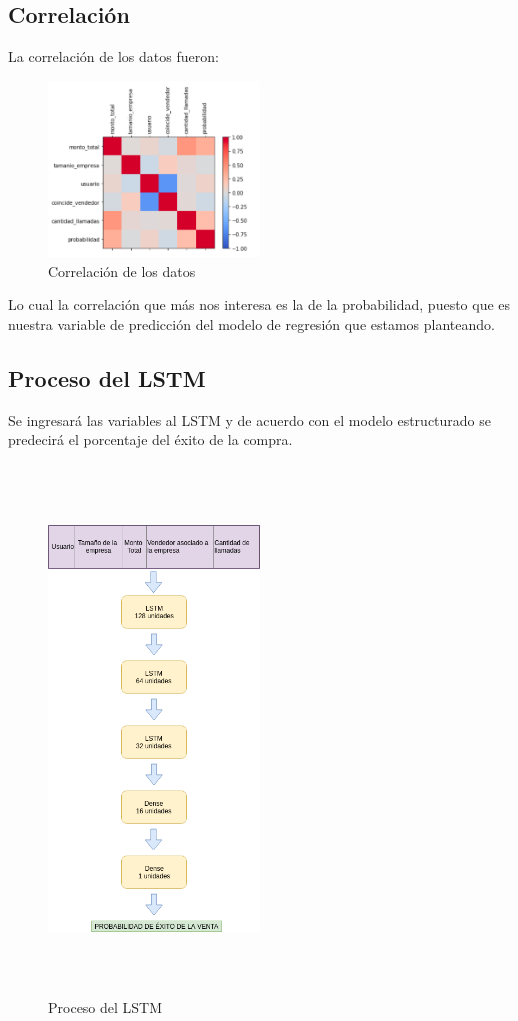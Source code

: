 \documentclass[conference]{IEEEtran}
\begin{document}
\subsection{Correlación}
La correlación de los datos fueron:
\begin{figure}[H]
    \centering
    \includegraphics[width=0.5\textwidth]{preprocesamiento/correlacion_datos}
    \caption{Correlación de los datos}
    \label{fig:correlacion_datos}
\end{figure}
Lo cual la correlación que más nos interesa es la de la probabilidad,
puesto que es nuestra variable de predicción del modelo de regresión que estamos 
planteando.
\subsection{Proceso del LSTM}
Se ingresará las variables al LSTM y de acuerdo con el modelo estructurado se predecirá el porcentaje del éxito de la compra.
\begin{figure}[H]
    \centering
    \includegraphics[width=0.5\textwidth,height=14cm]{LSTM}
    \caption{Proceso del LSTM}
    \label{fig:proceso_lstm}
\end{figure}
\end{document}
